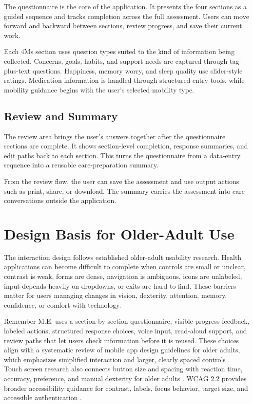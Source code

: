 \documentclass[11pt]{article}
\begin{document}
The questionnaire is the core of the application. It presents the four sections as a guided sequence and tracks completion across the full assessment. Users can move forward and backward between sections, review progress, and save their current work.

Each 4Ms section uses question types suited to the kind of information being collected. Concerns, goals, habits, and support needs are captured through tag-plus-text questions. Happiness, memory worry, and sleep quality use slider-style ratings. Medication information is handled through structured entry tools, while mobility guidance begins with the user's selected mobility type.

\subsection{Review and Summary}

The review area brings the user's answers together after the questionnaire sections are complete. It shows section-level completion, response summaries, and edit paths back to each section. This turns the questionnaire from a data-entry sequence into a reusable care-preparation summary.

From the review flow, the user can save the assessment and use output actions such as print, share, or download. The summary carries the assessment into care conversations outside the application.

\section{Design Basis for Older-Adult Use}

The interaction design follows established older-adult usability research. Health applications can become difficult to complete when controls are small or unclear, contrast is weak, forms are dense, navigation is ambiguous, icons are unlabeled, input depends heavily on dropdowns, or exits are hard to find. These barriers matter for users managing changes in vision, dexterity, attention, memory, confidence, or comfort with technology.

Remember M.E. uses a section-by-section questionnaire, visible progress feedback, labeled actions, structured response choices, voice input, read-aloud support, and review paths that let users check information before it is reused. These choices align with a systematic review of mobile app design guidelines for older adults, which emphasizes simplified interaction and larger, clearly spaced controls \cite{gomez-hernandez-older-adult-guidelines}. Touch screen research also connects button size and spacing with reaction time, accuracy, preference, and manual dexterity for older adults \cite{jin-touchscreen-older-adults}. WCAG 2.2 provides broader accessibility guidance for contrast, labels, focus behavior, target size, and accessible authentication \cite{wcag22}.
\end{document}

